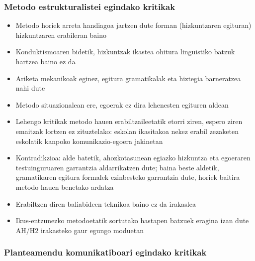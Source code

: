 \documentclass[
]{book}
\providecommand{\tightlist}{%
  \setlength{\itemsep}{0pt}\setlength{\parskip}{0pt}}
\begin{document}
\hypertarget{metodo-estrukturalistei-egindako-kritikak}{%
\subsubsection{Metodo estrukturalistei egindako kritikak}\label{metodo-estrukturalistei-egindako-kritikak}}

\begin{itemize}
\tightlist
\item
  Metodo horiek arreta handiagoa jartzen dute forman (hizkuntzaren egituran) hizkuntzaren erabileran baino
\item
  Konduktismoaren bidetik, hizkuntzak ikastea ohitura linguistiko batzuk hartzea baino ez da
\item
  Ariketa mekanikoak eginez, egitura gramatikalak eta hiztegia barneratzea nahi dute
\item
  Metodo situazionalean ere, egoerak ez dira lehenesten egituren aldean
\item
  Lehengo kritikak metodo hauen erabiltzaileetatik etorri ziren, espero ziren emaitzak lortzen ez zituztelako: eskolan ikasitakoa nekez erabil zezaketen eskolatik kanpoko komunikazio-egoera jakinetan
\item
  Kontradikzioa: alde batetik, ahozkotasunean egiazko hizkuntza eta egoeraren testuinguruaren garrantzia aldarrikatzen dute; baina beste aldetik, gramatikaren egitura formalek ezinbesteko garrantzia dute, horiek baitira metodo hauen benetako ardatza
\item
  Erabiltzen diren baliabideen teknikoa baino ez da irakaslea
\item
  Ikus-entzunezko metodoetatik sortutako hastapen batzuek eragina izan dute AH/H2 irakasteko gaur egungo moduetan
\end{itemize}

\hypertarget{planteamendu-komunikatiboari-egindako-kritikak}{%
\subsubsection{Planteamendu komunikatiboari egindako kritikak}\label{planteamendu-komunikatiboari-egindako-kritikak}}
\end{document}
